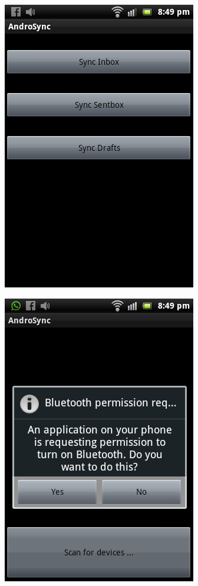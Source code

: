 \newpage
\vspace*{1cm}
\begin{figure}[H]
  \centering
    \includegraphics[scale=0.6]{project/images/AndroSyncClient/andro-client03}
\end{figure}
\vspace{1cm}
\begin{figure}[H]
  \centering
    \includegraphics[scale=0.6]{project/images/AndroSyncClient/andro-client04}
\end{figure}
